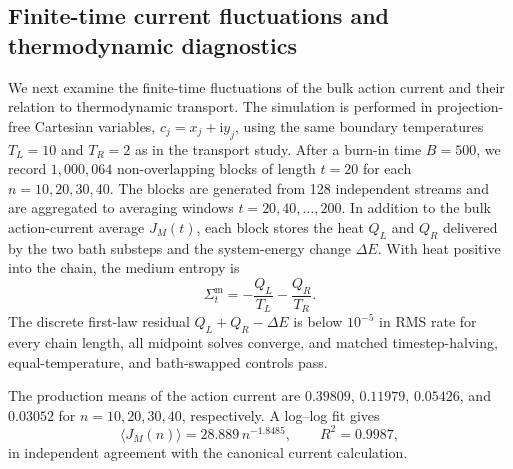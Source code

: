 
\subsection{Finite-time current fluctuations and thermodynamic diagnostics}
\label{sec:finite-time-fluctuations}

We next examine the finite-time fluctuations of the bulk action current and
their relation to thermodynamic transport.  The simulation is performed in
projection-free Cartesian variables, $c_j=x_j+\mathrm{i}y_j$, using the same
boundary temperatures $T_L=10$ and $T_R=2$ as in the transport study.  After a
burn-in time $B=500$, we record $1{,}000{,}064$ non-overlapping blocks of length
$t=20$ for each $n=10,20,30,40$.  The blocks are generated from 128 independent
streams and are aggregated to averaging windows $t=20,40,\ldots,200$.  In
addition to the bulk action-current average $J_M(t)$, each block stores the
heat $Q_L$ and $Q_R$ delivered by the two bath substeps and the system-energy
change $\Delta E$.  With heat positive into the chain, the medium entropy is
\begin{equation}
  \Sigma_t^{\mathrm m}=-\frac{Q_L}{T_L}-\frac{Q_R}{T_R}.
\end{equation}
The discrete first-law residual $Q_L+Q_R-\Delta E$ is below $10^{-5}$ in RMS
rate for every chain length, all midpoint solves converge, and matched
timestep-halving, equal-temperature, and bath-swapped controls pass.

The production means of the action current are $0.39809$, $0.11979$,
$0.05426$, and $0.03052$ for $n=10,20,30,40$, respectively.  A log--log fit
gives
\begin{equation}
  \langle J_M(n)\rangle = 28.889\,n^{-1.8485},
  \qquad R^2=0.9987,
\end{equation}
in independent agreement with the canonical current calculation.

